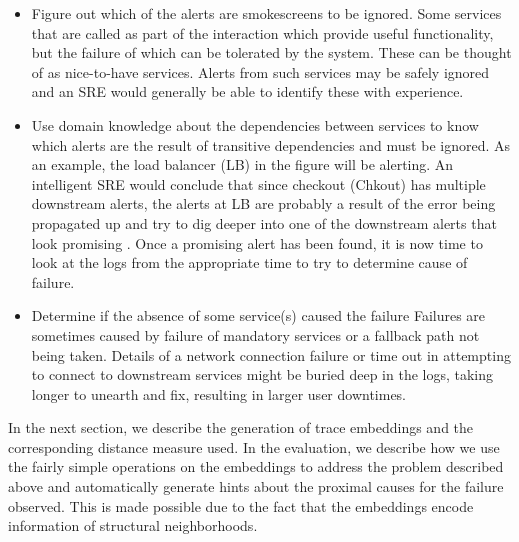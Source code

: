 \begin{itemize}
\item Figure out which of the alerts are smokescreens to be ignored. \newline
Some services that are called as part of the interaction which provide useful functionality, but the failure of which can be tolerated by the system. 
These can be thought of as nice-to-have  services. Alerts from such services may be safely ignored and an SRE would generally be able to identify these with experience.
\item Use domain knowledge about the dependencies between services to know which alerts are the result of transitive dependencies and must be ignored. \newline
As an example, the load balancer (LB) in the figure will be alerting. 
An intelligent  SRE would conclude that since checkout (Chkout) has multiple downstream alerts, the alerts at LB are probably a result of the error being propagated up and try to dig deeper into one of the downstream alerts that look promising . 
Once a promising alert has been found, it is now time to look at the logs from the appropriate time to try to determine cause of failure.
\item Determine if the absence of some service(s) caused the failure \newline
Failures are sometimes caused by failure of mandatory services or a fallback path not being taken. Details of a network connection failure or time out in attempting to connect to downstream services might be buried deep in the logs, taking longer to unearth and fix, resulting in larger user downtimes. 
\end{itemize}

In the next section, we describe the generation of trace embeddings and the corresponding distance measure used. 
In the evaluation, we describe how we use the fairly simple operations on the embeddings to address the problem described above and automatically generate hints about the proximal causes for the failure observed. 
This is made possible due to the fact that the embeddings encode information of structural neighborhoods.
